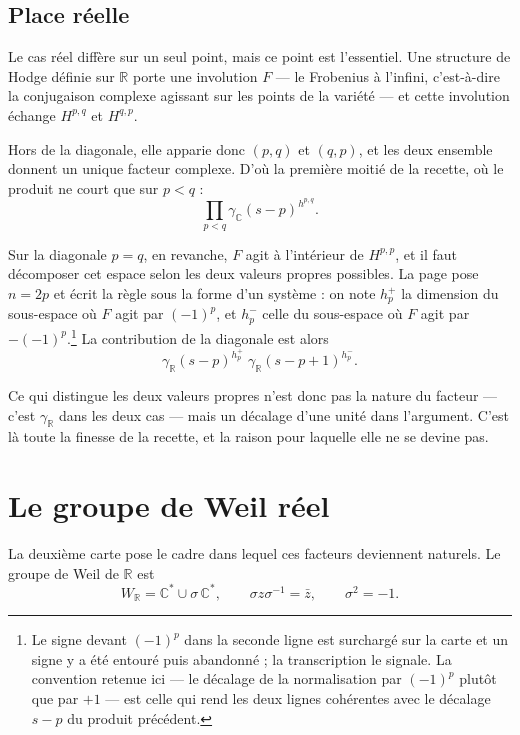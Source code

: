 \documentclass[11pt,a4paper]{article}
\begin{document}
\subsection*{Place réelle}

Le cas réel diffère sur un seul point, mais ce point est l'essentiel. Une
structure de Hodge définie sur $\mathbb{R}$ porte une involution $F$ --- le
Frobenius à l'infini, c'est-à-dire la conjugaison complexe agissant sur les
points de la variété --- et cette involution échange $H^{p,q}$ et $H^{q,p}$.

Hors de la diagonale, elle apparie donc $(p,q)$ et $(q,p)$, et les deux
ensemble donnent un unique facteur complexe. D'où la première moitié de la
recette, où le produit ne court que sur $p < q$ :
\[
\prod_{p<q} \gamma_{\mathbb{C}}(s-p)^{h^{p,q}}.
\]

Sur la diagonale $p = q$, en revanche, $F$ agit à l'intérieur de $H^{p,p}$, et
il faut décomposer cet espace selon les deux valeurs propres possibles. La page
pose $n = 2p$ et écrit la règle sous la forme d'un système : on note
$h_{p}^{+}$ la dimension du sous-espace où $F$ agit par $(-1)^{p}$, et
$h_{p}^{-}$ celle du sous-espace où $F$ agit par $-(-1)^{p}$.\footnote{Le signe
devant $(-1)^{p}$ dans la seconde ligne est surchargé sur la carte et un signe
y a été entouré puis abandonné ; la transcription le signale. La convention
retenue ici --- le décalage de la normalisation par $(-1)^{p}$ plutôt que par
$+1$ --- est celle qui rend les deux lignes cohérentes avec le décalage
$s - p$ du produit précédent.} La contribution de la diagonale est alors
\[
\gamma_{\mathbb{R}}(s-p)^{h_{p}^{+}}\;\gamma_{\mathbb{R}}(s-p+1)^{h_{p}^{-}}.
\]

Ce qui distingue les deux valeurs propres n'est donc pas la nature du facteur
--- c'est $\gamma_{\mathbb{R}}$ dans les deux cas --- mais un décalage d'une
unité dans l'argument. C'est là toute la finesse de la recette, et la raison
pour laquelle elle ne se devine pas.

\section*{Le groupe de Weil réel}

La deuxième carte pose le cadre dans lequel ces facteurs deviennent naturels.
Le groupe de Weil de $\mathbb{R}$ est
\[
W_{\mathbb{R}} = \mathbb{C}^{*} \cup \sigma\,\mathbb{C}^{*},
\qquad
\sigma z \sigma^{-1} = \bar{z},
\qquad
\sigma^{2} = -1 .
\]
\end{document}

